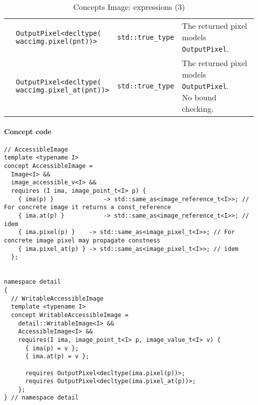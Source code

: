 \begin{table}[H]
\begin{scriptsize}
\begin{tabular}{llll}
      \multicolumn{1}{c|}{}                                 & \makecell[l]{\texttt{OutputPixel<decltype(}                                                                                         \\\texttt{waccimg.pixel(pnt))>}}                            & \texttt{std::true\_type}                      & \makecell[l]{The returned pixel \\ models \texttt{OutputPixel}.} \\
      \multicolumn{1}{c|}{}                                 & \makecell[l]{\texttt{OutputPixel<decltype(}                                                                                         \\\texttt{waccimg.pixel\_at(pnt))>}}                            & \texttt{std::true\_type}                      & \makecell[l]{The returned pixel \\ models \texttt{OutputPixel}. \\ No bound checking.} \\
      \cline{1-4}
    \end{tabular}
    \smallskip

    \caption{Concepts Image: expressions (3)}
  \end{scriptsize}
  \label{table:concept.image.expressions.3}
\end{table}

\paragraph{Concept code}

\begin{verbatim}
// AccessibleImage
template <typename I>
concept AccessibleImage =
  Image<I> &&
  image_accessible_v<I> &&
  requires (I ima, image_point_t<I> p) {
    { ima(p) }              -> std::same_as<image_reference_t<I>>; // For concrete image it returns a const_reference
    { ima.at(p) }           -> std::same_as<image_reference_t<I>>; // idem
    { ima.pixel(p) }    -> std::same_as<image_pixel_t<I>>; // For concrete image pixel may propagate constness
    { ima.pixel_at(p) } -> std::same_as<image_pixel_t<I>>; // idem
  };


namespace detail
{
  // WritableAccessibleImage
  template <typename I>
  concept WritableAccessibleImage =
    detail::WritableImage<I> &&
    AccessibleImage<I> &&
    requires(I ima, image_point_t<I> p, image_value_t<I> v) {
      { ima(p) = v };
      { ima.at(p) = v };

      requires OutputPixel<decltype(ima.pixel(p))>;
      requires OutputPixel<decltype(ima.pixel_at(p))>;
    };
} // namespace detail
\end{verbatim}

